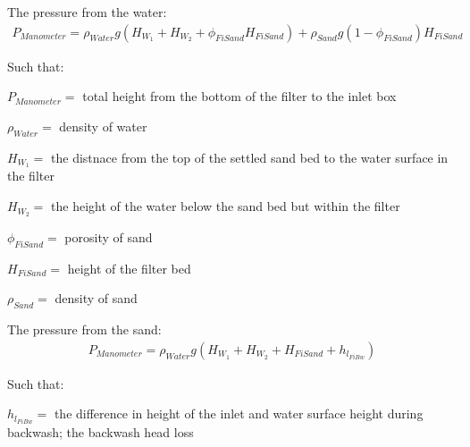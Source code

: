 \documentclass[letterpaper,10pt,english]{sphinxmanual}
\begin{document}
The pressure from the water:
\begin{equation}\label{equation:Filtration/Filtration_Derivations:Filtration/Filtration_Derivations:0}
\begin{split}P_{Manometer} = \rho_{Water} g \left( H_{W_1} + H_{W_2} + \phi_{FiSand} H_{FiSand} \right) + \rho_{Sand} g \left( 1 - \phi_{FiSand} \right) H_{FiSand}\end{split}
\end{equation}
\begin{DUlineblock}{0em}
\item[] Such that:
\item[] \(P_{Manometer} =\) total height from the bottom of the filter to the inlet box
\item[] \(\rho_{Water} =\) density of water
\item[] \(H_{W_1} =\) the distnace from the top of the settled sand bed to the water surface in the filter
\item[] \(H_{W_2} =\) the height of the water below the sand bed but within the filter
\item[] \(\phi_{FiSand} =\) porosity of sand
\item[] \(H_{FiSand} =\) height of the filter bed
\item[] \(\rho_{Sand} =\) density of sand
\end{DUlineblock}

The pressure from the sand:
\begin{equation}\label{equation:Filtration/Filtration_Derivations:Filtration/Filtration_Derivations:1}
\begin{split}P_{Manometer} = \rho_{Water} g \left( H_{W_1} + H_{W_2} + H_{FiSand} + h_{l_{FiBw}} \right)\end{split}
\end{equation}
\begin{DUlineblock}{0em}
\item[] Such that:
\item[] \(h_{l_{FiBw}} =\) the difference in height of the inlet and water surface height during backwash; the backwash head loss
\end{DUlineblock}
\end{document}
